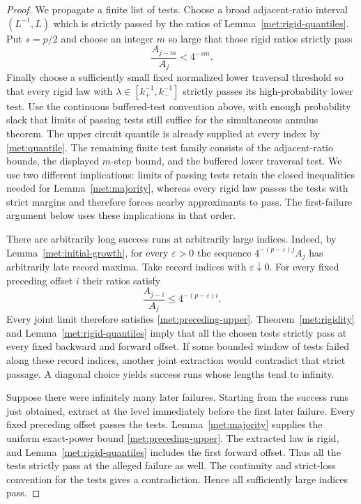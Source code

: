 \begin{proof}
We propagate a finite list of tests.  Choose a broad adjacent-ratio
interval $(L^{-1},L)$ which is strictly passed by the ratios of
Lemma~\ref{met:rigid-quantiles}.  Put $s=p/2$ and choose an integer
$m$ so large that those rigid ratios strictly pass
\[
 \frac{A_{j-m}}{A_j}<4^{-sm}.
\]
Finally choose a sufficiently small fixed normalized lower
traversal threshold so that every rigid law with
$\lambda\in[k_+^{-1},k_-^{-1}]$ strictly passes its
high-probability lower test.  Use the continuous buffered-test
convention above, with enough probability slack that limits of
passing tests still suffice for the simultaneous annulus theorem.
The upper circuit quantile is already supplied at every index by
\eqref{met:quantile}.  The remaining finite test family consists of
the adjacent-ratio bounds, the displayed $m$-step bound, and the
buffered lower traversal test.  We use two different implications:
limits of passing tests retain the closed inequalities needed for
Lemma~\ref{met:majority}, whereas every rigid law passes the tests
with strict margins and therefore forces nearby approximants to
pass.  The first-failure argument below uses these implications in
that order.

There are arbitrarily long success runs at arbitrarily large
indices.  Indeed, by Lemma~\ref{met:initial-growth}, for every
$\varepsilon>0$ the sequence
$4^{-(p-\varepsilon)j}A_j$ has arbitrarily late record maxima.
Take record indices with $\varepsilon\downarrow0$.  For every
fixed preceding offset $i$ their ratios satisfy
\[
 \frac{A_{j-i}}{A_j}\leq4^{-(p-\varepsilon)i}.
\]
Every joint limit therefore satisfies
\eqref{met:preceding-upper}.  Theorem~\ref{met:rigidity} and
Lemma~\ref{met:rigid-quantiles} imply that all the chosen tests
strictly pass at every fixed backward and forward offset.
If some bounded window of tests failed along these record indices,
another joint extraction would contradict that strict passage.
A diagonal choice yields success runs whose lengths tend to
infinity.

Suppose there were infinitely many later failures.  Starting from
the success runs just obtained, extract at the level immediately
before the first later failure.  Every fixed preceding offset
passes the tests.  Lemma~\ref{met:majority} supplies the uniform
exact-power bound \eqref{met:preceding-upper}.  The extracted law
is rigid, and Lemma~\ref{met:rigid-quantiles} includes the first
forward offset.  Thus all the tests strictly pass at the alleged
failure as well.  The continuity and strict-loss convention for
the tests gives a contradiction.  Hence all sufficiently large
indices pass.


\end{proof}
